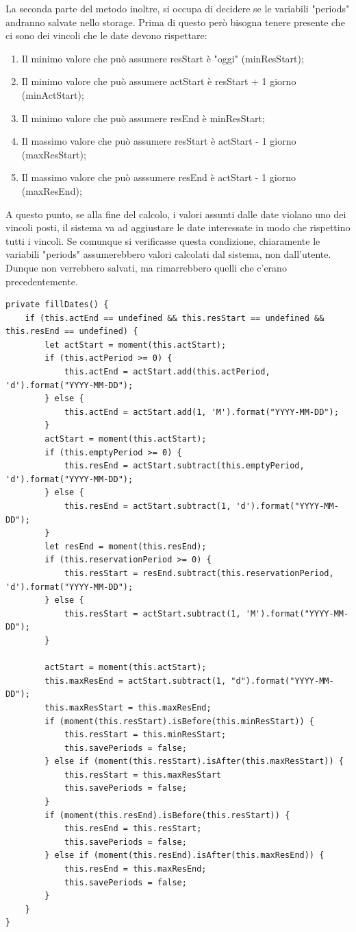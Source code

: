 \documentclass[Lau, oneside]{sapthesis}%
\begin{document}
La seconda parte del metodo inoltre, si occupa di decidere se le variabili "periods" andranno salvate nello storage. Prima di questo però bisogna tenere presente che ci sono dei vincoli che le date devono rispettare:
\begin{enumerate}
	\item Il minimo valore che può assumere resStart è "oggi" (minResStart);
	\item Il minimo valore che può assumere actStart è resStart + 1 giorno (minActStart);
	\item Il minimo valore che può assumere resEnd è minResStart;
	\item Il massimo valore che può assumere resStart è actStart - 1 giorno (maxResStart);
	\item Il massimo valore che può asssumere resEnd è  actStart - 1 giorno (maxResEnd);
\end{enumerate}
A questo punto, se alla fine del calcolo, i valori assunti dalle date violano uno dei vincoli posti, il sistema va ad aggiustare le date interessate in modo che rispettino tutti i vincoli. Se comunque si verificasse questa condizione, chiaramente le variabili "periods" assumerebbero valori calcolati dal sistema, non dall'utente. Dunque non verrebbero salvati, ma rimarrebbero quelli che c'erano precedentemente.

\begin{lstlisting}[frame=single]
private fillDates() {
	if (this.actEnd == undefined && this.resStart == undefined && this.resEnd == undefined) {
		let actStart = moment(this.actStart);
		if (this.actPeriod >= 0) {
			this.actEnd = actStart.add(this.actPeriod, 'd').format("YYYY-MM-DD");
		} else {
			this.actEnd = actStart.add(1, 'M').format("YYYY-MM-DD");
		}
		actStart = moment(this.actStart);
		if (this.emptyPeriod >= 0) {
			this.resEnd = actStart.subtract(this.emptyPeriod, 'd').format("YYYY-MM-DD");
		} else {
			this.resEnd = actStart.subtract(1, 'd').format("YYYY-MM-DD");
		}
		let resEnd = moment(this.resEnd);
		if (this.reservationPeriod >= 0) {
			this.resStart = resEnd.subtract(this.reservationPeriod, 'd').format("YYYY-MM-DD");
		} else {
			this.resStart = actStart.subtract(1, 'M').format("YYYY-MM-DD");
		}

		actStart = moment(this.actStart);
		this.maxResEnd = actStart.subtract(1, "d").format("YYYY-MM-DD");
		this.maxResStart = this.maxResEnd;
		if (moment(this.resStart).isBefore(this.minResStart)) {
			this.resStart = this.minResStart;
			this.savePeriods = false;
		} else if (moment(this.resStart).isAfter(this.maxResStart)) {
			this.resStart = this.maxResStart
			this.savePeriods = false;
		}
		if (moment(this.resEnd).isBefore(this.resStart)) {
			this.resEnd = this.resStart;
			this.savePeriods = false;
		} else if (moment(this.resEnd).isAfter(this.maxResEnd)) {
			this.resEnd = this.maxResEnd;
			this.savePeriods = false;
		}
	}
}
\end{lstlisting}
\end{document}
